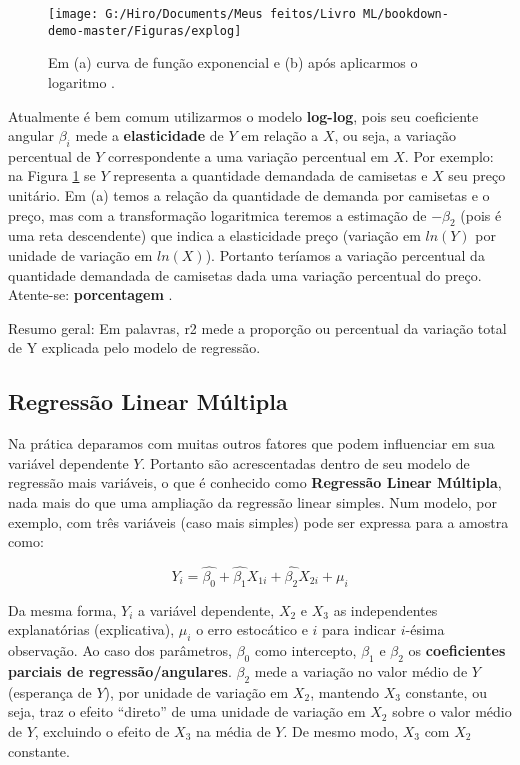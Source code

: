 \documentclass[
]{book}
\begin{document}
\begin{figure}

{\centering \texttt{[image: G:/Hiro/Documents/Meus feitos/Livro ML/bookdown-demo-master/Figuras/explog]} 

}

\caption{Em (a) curva de função exponencial e (b) após aplicarmos o logaritmo \citep{gujarati2011econometria}.}\label{fig:explog}
\end{figure}



Atualmente é bem comum utilizarmos o modelo \textbf{log-log}, pois seu coeficiente angular \(\beta_i\) mede a \textbf{elasticidade} de \(Y\) em relação a \(X\), ou seja, a variação percentual de \(Y\) correspondente a uma variação percentual em \(X\). Por exemplo: na Figura \ref{fig:explog} se \(Y\) representa a quantidade demandada de camisetas e \(X\) seu preço unitário. Em (a) temos a relação da quantidade de demanda por camisetas e o preço, mas com a transformação logaritmica teremos a estimação de \(-\beta_2\) (pois é uma reta descendente) que indica a elasticidade preço (variação em \(ln(Y)\) por unidade de variação em \(ln(X)\)). Portanto teríamos a variação percentual da quantidade demandada de camisetas dada uma variação percentual do preço. Atente-se: \textbf{porcentagem} \citep{gujarati2011econometria}.

Resumo geral: Em palavras, r2 mede a proporção ou percentual da variação total de Y explicada pelo modelo de regressão.

\hypertarget{regmult}{%
\subsection{Regressão Linear Múltipla}\label{regmult}}

Na prática deparamos com muitas outros fatores que podem influenciar em sua variável dependente \(Y\). Portanto são acrescentadas dentro de seu modelo de regressão mais variáveis, o que é conhecido como \textbf{Regressão Linear Múltipla}, nada mais do que uma ampliação da regressão linear simples. Num modelo, por exemplo, com três variáveis (caso mais simples) pode ser expressa para a amostra como:

\begin{equation}
    Y_i=\hat{\beta_0}+\hat{\beta_{1}}X_{1i}+\hat{\beta_{2}}X_{2i}+\mu_i
    \label{eq:regmult}
\end{equation}

Da mesma forma, \(Y_i\) a variável dependente, \(X_{2}\) e \(X_{3}\) as independentes explanatórias (explicativa), \(\mu_i\) o erro estocático e \(i\) para indicar \(i\)-ésima observação. Ao caso dos parâmetros, \(\beta_0\) como intercepto, \(\beta_1\) e \(\beta_2\) os \textbf{coeficientes parciais de regressão/angulares}. \(\beta_2\) mede a variação no valor médio de \(Y\) (esperança de \(Y\)), por unidade de variação em \(X_2\), mantendo \(X_3\) constante, ou seja, traz o efeito ``direto'' de uma unidade de variação em \(X_2\) sobre o valor médio de \(Y\), excluindo o efeito de \(X_3\) na média de \(Y\). De mesmo modo, \(X_3\) com \(X_2\) constante.
\end{document}
